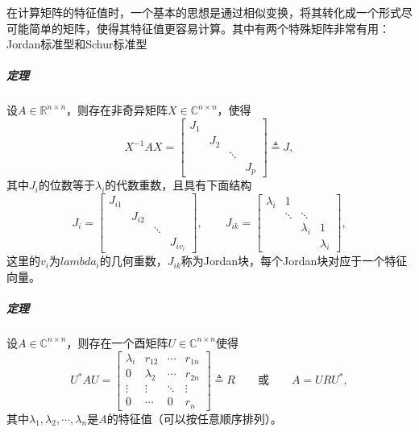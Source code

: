 \documentclass[UTF8]{article}
\begin{document}
\begin{flushleft}
在计算矩阵的特征值时，一个基本的思想是通过相似变换，将其转化成一个形式尽可能简单的矩阵，使得其特征值更容易计算。其中有两个特殊矩阵非常有用：\textcolor[rgb]{0.00,0.07,1.00}{Jordan标准型}和\textcolor[rgb]{0.00,0.07,1.00}{Schur标准型}

\subparagraph{定理}
设$A\in\mathbb{R}^{n \times n}$，则存在非奇异矩阵$X\in\mathbb{C}^{n \times n}$，使得
$$
X^{-1}AX=
\begin{bmatrix}
J_1 &     &    &    \\
    & J_2 &    &    \\
    &     & \ddots &    \\
    &     &    & J_p
\end{bmatrix}
\triangleq J,
$$
其中$J_i$的位数等于$\lambda_i$的代数重数，且具有下面结构
$$
J_i=
\begin{bmatrix}
J_{i1}   &         &        &     \\
         & J_{i2}  &        &     \\
         &         & \ddots &     \\
         &         &        & J_{iv_i}
\end{bmatrix},
\qquad
J_{ik}=
\begin{bmatrix}
\lambda_i  & 1    &     &      \\
           & \ddots & \ddots & \\
           &      & \lambda_i & 1 \\
           &      &      & \lambda_i
\end{bmatrix},
$$
这里的$v_i$为$lambda_i$的几何重数，$J_{ik}$称为\textcolor[rgb]{0.00,0.07,1.00}{Jordan块}，每个Jordan块对应于一个特征向量。

\subparagraph{定理}
设$A\in\mathbb{C}^{n \times n}$，则存在一个酉矩阵$U\in\mathbb{C}^{n \times n}$使得
$$
U^*AU=
\begin{bmatrix}
\lambda_i   & \mathit{r}_{12} & \cdots  & \mathit{r}_{1n}  \\
0           & \lambda_2       & \cdots  & \mathit{r}_{2n}  \\
\vdots      & \vdots          & \ddots  & \vdots           \\
0           & \cdots          & 0       & \mathit{r}_n
\end{bmatrix}
\triangleq R \qquad 或 \qquad
A=URU^*,
$$
其中$\lambda_1,\lambda_2,\cdots,\lambda_n$是$A$的特征值（可以按任意顺序排列）。
\end{flushleft}
\end{document}
